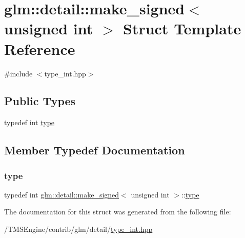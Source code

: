 \hypertarget{structglm_1_1detail_1_1make__signed_3_01unsigned_01int_01_4}{}\section{glm\+:\+:detail\+:\+:make\+\_\+signed$<$ unsigned int $>$ Struct Template Reference}
\label{structglm_1_1detail_1_1make__signed_3_01unsigned_01int_01_4}


{\ttfamily \#include $<$type\+\_\+int.\+hpp$>$}

\subsection*{Public Types}
\begin{DoxyCompactItemize}
\item 
typedef int \hyperlink{structglm_1_1detail_1_1make__signed_3_01unsigned_01int_01_4_a78b4ada342bba40027f755d20eae141a}{type}
\end{DoxyCompactItemize}


\subsection{Member Typedef Documentation}
\mbox{\label{structglm_1_1detail_1_1make__signed_3_01unsigned_01int_01_4_a78b4ada342bba40027f755d20eae141a}} 
\subsubsection{\texorpdfstring{type}{type}}
{\footnotesize\ttfamily typedef int \hyperlink{structglm_1_1detail_1_1make__signed}{glm\+::detail\+::make\+\_\+signed}$<$ unsigned int $>$\+::\hyperlink{structglm_1_1detail_1_1make__signed_3_01unsigned_01int_01_4_a78b4ada342bba40027f755d20eae141a}{type}}



The documentation for this struct was generated from the following file\+:\begin{DoxyCompactItemize}
\item 
/\+T\+M\+S\+Engine/contrib/glm/detail/\hyperlink{type__int_8hpp}{type\+\_\+int.\+hpp}\end{DoxyCompactItemize}
